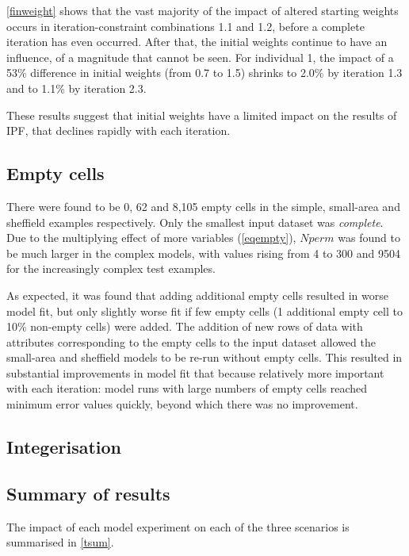 \documentclass[a4paper,10pt]{article}
\begin{document}
\cref{finweight} shows that the vast majority of the impact of altered starting weights occurs in iteration-constraint
combinations 1.1 and 1.2, before a complete iteration has even occurred. 
After that, the initial weights continue to have an influence, of a magnitude that cannot be 
seen. For individual 1, the impact of a 53\% difference in initial weights (from 0.7 to 1.5) shrinks to 
2.0\% by iteration 1.3 and to 1.1\% by iteration 2.3. 

These results suggest that initial weights have a limited impact on the results of IPF, that declines rapidly with each iteration. 

\subsection{Empty cells}

There were found to be 0, 62 and 8,105 empty cells in the simple, small-area and sheffield
examples respectively. Only the smallest input dataset was
\emph{complete}. Due to the multiplying effect of more variables (\cref{eqempty}),
$Nperm$ was found to be much larger in the complex models, with values rising from
4 to 300 and 9504 for the increasingly complex test examples. 

As expected, it was found that adding additional empty cells
resulted in worse model fit, but only slightly worse fit if few empty
cells (1 additional empty cell to 10\% non-empty cells) were added.
The addition of new rows of data with attributes corresponding
to the empty cells to the input dataset allowed the small-area and sheffield
models to be re-run without empty cells. This resulted in substantial improvements in
model fit that because relatively more important with each iteration: model
runs with large numbers of empty cells reached minimum error values quickly, beyond
which there was no improvement.

\subsection{Integerisation}

\subsection{Summary of results}

The impact of each model experiment on each of the three scenarios
is summarised in \cref{tsum}.
\end{document}
